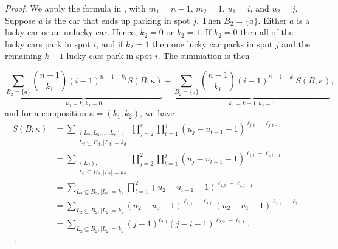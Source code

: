 \documentclass[reqno]{amsart}
\theoremstyle{definition}
\theoremstyle{remark}
\begin{document}
\begin{proof}
We apply the formula in , with $m_1 = n-1$, $m_2 =1$, $u_1=i$, and $u_2=j$.
Suppose $a$ is the car that ends up parking in spot $j$. Then $B_2=\{a\}$. Either $a$ is a lucky car or an unlucky car. Hence, $k_2 = 0$ or $k_2 =1$. If $k_2=0$ then all of the lucky cars park in spot $i$, and if $k_2=1$ then one lucky car parks in spot $j$ and the remaining $k-1$ lucky cars park in spot $i$.
The summation is then

\begin{equation}
  \label{eq:corollaryupfs}
\underbrace{\sum_{B_2 = \{a\}}\binom{n-1}{k_1}(i-1)^{n-1-k_1} S(B ; \kappa)}_{k_1=k,k_2=0} + \underbrace{\sum_{B_2 = \{a\}}\binom{n-1}{k_1}(i-1)^{n-1-k_1} S(B ; \kappa)}_{k_1=k-1,k_2=1},
\end{equation}
and for a composition $\kappa = (k_1, k_2)$, we have \begin{align*}
S(B;\kappa) &= \sum_{{\substack{(L_2,L_3,\ldots,L_r),\\L_d\subseteq B_d, |L_d|=k_d}}}\prod_{j=2}^r \prod_{t=1}^{j} (u_{j}-u_{t-1}-1)^{\ell_{j,t}-\ell_{j,t-1}} \\
&=\sum_{{\substack{(L_2),\\L_2\subseteq B_2, |L_2|=k_2}}}\prod_{j=2}^2 \prod_{t=1}^{j} (u_{j}-u_{t-1}-1)^{\ell_{j,t}-\ell_{j,t-1}}\\
&=\sum_{L_2\subseteq B_2, |L_2|=k_2} \prod_{t=1}^{2} (u_{2}-u_{t-1}-1)^{\ell_{2,t}-\ell_{2,t-1}}\\
&=\sum_{L_2\subseteq B_2, |L_2|=k_2} (u_{2}-u_{0}-1)^{\ell_{2,1}-\ell_{2,0}} (u_{2}-u_{1}-1)^{\ell_{2,2}-\ell_{2,1}} \\
&=\sum_{L_2\subseteq B_2, |L_2|=k_2} (j-1)^{\ell_{2,1}} (j-i-1)^{\ell_{2,2}-\ell_{2,1}}.
\end{align*}


\end{proof}
\end{document}
